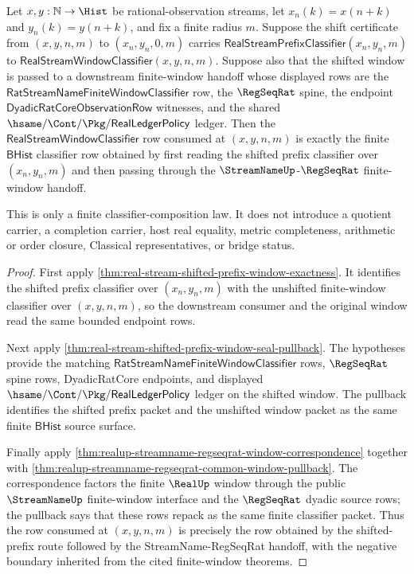 \begin{theorem}
\label{thm:real-stream-shifted-prefix-window-classifier-composition}
Let $x,y:\mathbb{N}\to\Hist$ be rational-observation streams, let
$x_n(k)=x(n+k)$ and $y_n(k)=y(n+k)$, and fix a finite radius $m$. Suppose the
shift certificate from $(x,y,n,m)$ to $(x_n,y_n,0,m)$ carries
$\mathsf{RealStreamPrefixClassifier}(x_n,y_n,m)$ to
$\mathsf{RealStreamWindowClassifier}(x,y,n,m)$. Suppose also that the shifted
window is passed to a downstream finite-window handoff whose displayed rows are
the $\mathsf{RatStreamNameFiniteWindowClassifier}$ row, the $\RegSeqRat$ spine,
the endpoint $\mathsf{DyadicRatCoreObservationRow}$ witnesses, and the shared
$\hsame/\Cont/\Pkg/\mathsf{RealLedgerPolicy}$ ledger. Then the
$\mathsf{RealStreamWindowClassifier}$ row consumed at $(x,y,n,m)$ is exactly the
finite $\mathsf{BHist}$ classifier row obtained by first reading the shifted
prefix classifier over $(x_n,y_n,m)$ and then passing through the
$\StreamNameUp$-$\RegSeqRat$ finite-window handoff.

This is only a finite classifier-composition law. It does not introduce a
quotient carrier, a completion carrier, host real equality, metric
completeness, arithmetic or order closure, Classical representatives, or bridge
status.
\end{theorem}
\begin{proof}
First apply
\autoref{thm:real-stream-shifted-prefix-window-exactness}. It identifies the
shifted prefix classifier over $(x_n,y_n,m)$ with the unshifted finite-window
classifier over $(x,y,n,m)$, so the downstream consumer and the original window
read the same bounded endpoint rows.

Next apply
\autoref{thm:real-stream-shifted-prefix-window-seal-pullback}. The hypotheses
provide the matching $\mathsf{RatStreamNameFiniteWindowClassifier}$ rows,
$\RegSeqRat$ spine rows, DyadicRatCore endpoints, and displayed
$\hsame/\Cont/\Pkg/\mathsf{RealLedgerPolicy}$ ledger on the shifted window.
The pullback identifies the shifted prefix packet and the unshifted window
packet as the same finite $\mathsf{BHist}$ source surface.

Finally apply
\autoref{thm:realup-streamname-regseqrat-window-correspondence} together with
\autoref{thm:realup-streamname-regseqrat-common-window-pullback}. The
correspondence factors the finite $\RealUp$ window through the public
$\StreamNameUp$ finite-window interface and the $\RegSeqRat$ dyadic source
rows; the pullback says that these rows repack as the same finite classifier
packet. Thus the row consumed at $(x,y,n,m)$ is precisely the row obtained by
the shifted-prefix route followed by the StreamName-RegSeqRat handoff, with the
negative boundary inherited from the cited finite-window theorems.
\end{proof}

